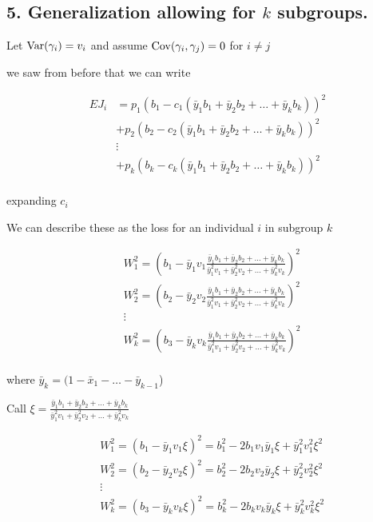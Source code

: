 
\subsection*{5. Generalization allowing for $k$ subgroups.}

Let $\mathrm{Var}(\gamma_i) = v_{i}$ and assume $\mathrm{Cov}(\gamma_i, \gamma_j) = 0$ for $i \neq j$

we saw from before that we can write

\begin{align*}
	E J_i &= p_1 ( b_1 - c_1 (\bar{y}_1 b_1 + \bar{y}_2 b_2 + \ldots + \bar{y}_k b_k ))^2 \\
		  &+ p_2 ( b_2 - c_2 (\bar{y}_1 b_1 +  \bar{y}_2 b_2 + \ldots + \bar{y}_k b_k ))^2 \\
		  &\vdots \\
		  &+ p_k ( b_k - c_k (\bar{y}_1 b_1 +\bar{y}_2 b_2 +  \ldots + \bar{y}_k b_k ))^2 \\
\end{align*}

expanding $c_i$ 

We can describe these as the loss for an individual $i$ in subgroup $k$ 

\begin{align*}
		  &W_1^2= \left( b_1 -  \bar{y}_1 v_1\frac{ \bar{y}_1 b_1 + \bar{y}_2 b_2 + \ldots + \bar{y}_k b_k }{\bar{y}_1^2 v_1 + \bar{y}_2^2 v_2 + \ldots + \bar{y}_k^2 v_k} \right)^2 \\
		  &W_2^2= \left( b_2 -  \bar{y}_2 v_2\frac{ \bar{y}_1 b_1 + \bar{y}_2 b_2 + \ldots + \bar{y}_k b_k }{\bar{y}_1^2 v_1 + \bar{y}_2^2 v_2 + \ldots + \bar{y}_k^2 v_k} \right)^2 \\
		  & \vdots \\
		  &W_k^2 = \left( b_3 - \bar{y}_k v_k\frac{ \bar{y}_1 b_1 + \bar{y}_2 b_2 + \ldots + \bar{y}_k b_k }{\bar{y}_1^2 v_1 + \bar{y}_2^2 v_2 + \ldots + \bar{y}_k^2 v_k} \right)^2 \\
\end{align*} 

where $\bar{y}_k = (1 - \bar{x}_1 - \ldots - \bar{y}_{k-1}$)

Call $\xi = \frac{ \bar{y}_1 b_1 + \bar{y}_2 b_2 + \ldots + \bar{y}_k b_k }{\bar{y}_1^2 v_1 + \bar{y}_2^2 v_2 + \ldots + \bar{y}_k^2 v_k}$


\begin{align*}
		  &W_1^2=  \left( b_1 - \bar{y}_1 v_1 \xi \right)^2 = b_1^2 - 2 b_1 v_1 \bar{y}_1 \xi + \bar{y}_1^2 v_1^2 \xi^2 \\
		  &W_2^2= \left( b_2 -  \bar{y}_2 v_2 \xi \right)^2 = b_2^2 - 2 b_2 v_2 \bar{y}_2 \xi + \bar{y}_2^2 v_2^2 \xi^2 \\
		  & \vdots \\
		  &W_k^2 = \left( b_3 - \bar{y}_k v_k \xi \right)^2 = b_k^2 - 2 b_k v_k \bar{y}_k \xi + \bar{y}_k^2 v_k^2 \xi^2 \\
\end{align*} 

